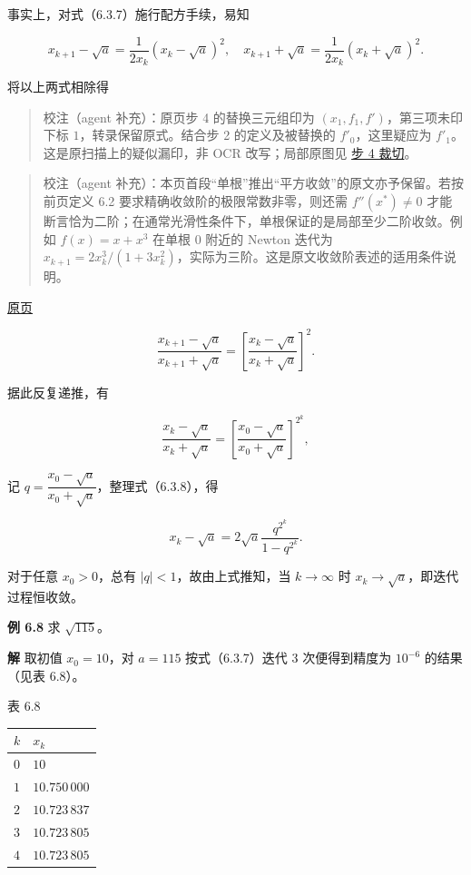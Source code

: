 \documentclass[
  10pt,
  fontset=fandol]{ctexart}
\newcounter{none} %
\begin{document}
事实上，对式（6.3.7）施行配方手续，易知

\[
x_{k+1}-\sqrt{a}=\frac{1}{2x_k}(x_k-\sqrt{a})^2,\quad
x_{k+1}+\sqrt{a}=\frac{1}{2x_k}(x_k+\sqrt{a})^2.
\]

将以上两式相除得

\begin{quote}
校注（agent 补充）：原页步 4 的替换三元组印为 \((x_1,f_1,f')\)，第三项未印下标 \(1\)，转录保留原式。结合步 2 的定义及被替换的 \(f'_0\)，这里疑应为 \(f'_1\)。这是原扫描上的疑似漏印，非 OCR 改写；局部原图见 \href{../assets/ch06/detail-p165-step4.png}{步 4 裁切}。
\end{quote}

\begin{quote}
校注（agent 补充）：本页首段``单根''推出``平方收敛''的原文亦予保留。若按前页定义 6.2 要求精确收敛阶的极限常数非零，则还需 \(f''(x^*)\ne0\) 才能断言恰为二阶；在通常光滑性条件下，单根保证的是局部至少二阶收敛。例如 \(f(x)=x+x^3\) 在单根 \(0\) 附近的 Newton 迭代为 \(x_{k+1}=2x_k^3/(1+3x_k^2)\)，实际为三阶。这是原文收敛阶表述的适用条件说明。
\end{quote}

\href{../../source-images/pdf-166.jpeg}{原页}

\[
\frac{x_{k+1}-\sqrt{a}}{x_{k+1}+\sqrt{a}}=\left[\frac{x_k-\sqrt{a}}{x_k+\sqrt{a}}\right]^2.
\]

据此反复递推，有

\[
\frac{x_k-\sqrt{a}}{x_k+\sqrt{a}}=\left[\frac{x_0-\sqrt{a}}{x_0+\sqrt{a}}\right]^{2^k},
\tag{6.3.8}
\]

记 \(q=\dfrac{x_0-\sqrt{a}}{x_0+\sqrt{a}}\)，整理式（6.3.8），得

\[
x_k-\sqrt{a}=2\sqrt{a}\frac{q^{2^k}}{1-q^{2^k}}.
\]

对于任意 \(x_0>0\)，总有 \(|q|<1\)，故由上式推知，当 \(k\to\infty\) 时 \(x_k\to\sqrt{a}\)，即迭代过程恒收敛。

\textbf{例 6.8} 求 \(\sqrt{115}\)。

\textbf{解} 取初值 \(x_0=10\)，对 \(a=115\) 按式（6.3.7）迭代 3 次便得到精度为 \(10^{-6}\) 的结果（见表 6.8）。

表 6.8

{\def\LTcaptype{none} %
\begin{longtable}[]{@{}ll@{}}
\toprule\noalign{}
\(k\) & \(x_k\) \\
\midrule\noalign{}
\endhead
\bottomrule\noalign{}
\endlastfoot
\(0\) & \(10\) \\
\(1\) & \(10.750\,000\) \\
\(2\) & \(10.723\,837\) \\
\(3\) & \(10.723\,805\) \\
\(4\) & \(10.723\,805\) \\
\end{longtable}
}
\end{document}
